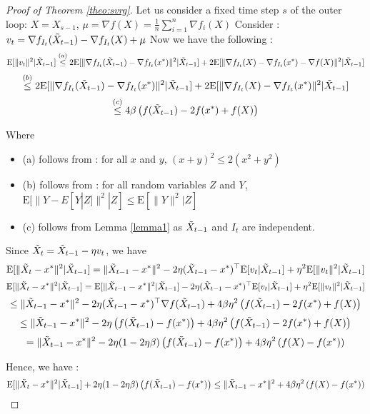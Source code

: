 \documentclass[12pt]{report}
\newcounter{theo}[section]
\newcommand{\E}{\mathrm{E}}
\begin{document}
\begin{proof}[Proof of Theorem \ref{theo:svrg}]


Let us consider a fixed time step $s$ of the outer loop: $X=X_{s-1}$, $\mu=\nabla f(X)=\frac{1}{n}\sum_{i=1}^n\nabla f_i(X)$
\newline
Consider : $v_t=\nabla f_{I_t}(\Tilde{X}_{t-1})-\nabla f_{I_t}(X)+\mu$
\newline
Now we have the following :
$$\E[\|v_t\|^2|\Tilde{X}_{t-1}]\overset{(a)}{\leq} 2 \E[\|\nabla f_{I_t}(\Tilde{X}_{t-1})-\nabla f_{I_t}(x^*)\|^2|\Tilde{X}_{t-1}]+2\E[\|\nabla f_{I_t}(X)-\nabla f_{I_t}(x^*)-\nabla f(X)\|^2|\Tilde{X}_{t-1}]$$
$$\overset{(b)}{\leq} 2 \E[\|\nabla f_{I_t}(\Tilde{X}_{t-1})-\nabla f_{I_t}(x^*)\|^2|\Tilde{X}_{t-1}]+2\E[\|\nabla f_{I_t}(X)-\nabla f_{I_t}(x^*)\|^2|\Tilde{X}_{t-1}]$$
$$\overset{(c)}{\leq} 4\beta\left( f(\Tilde{X}_{t-1})-2f(x^*)+f(X) \right)$$

Where \begin{itemize}
    \item (a) follows from : for all $x$ and $y$, $(x+y)^2\leq 2(x^2+y^2)$ 
    \item (b) follows from : for all random variables $Z$ and $Y$, $\E[\|Y-E[Y|Z]\|^2|Z]\leq \E\left[\|Y\|^2|Z\right]$
    \item (c) follows from Lemma \ref{lemma1} as $\Tilde{X}_{t-1}$ and $I_t$ are independent.
    
\end{itemize} 
Since $\Tilde{X}_{t}=\Tilde{X}_{t-1}-\eta v_t$, we have
$$\E[\|\Tilde{X}_{t}-x^*\|^2|\Tilde{X}_{t-1}]= \|\Tilde{X}_{t-1}-x^*\|^2-2\eta(\Tilde{X}_{t-1}-x^*)^\top \E[v_t|\Tilde{X}_{t-1}]+\eta^2\E[\|v_t\|^2|\Tilde{X}_{t-1}]$$
$$\E[\|\Tilde{X}_{t}-x^*\|^2|\Tilde{X}_{t-1}]=\E[\|\Tilde{X}_{t-1}-x^*\|^2|\Tilde{X}_{t-1}]-2\eta(\Tilde{X}_{t-1}-x^*)^\top\E[v_t|\Tilde{X}_{t-1}]+\eta^2\E[\|v_t\|^2|\Tilde{X}_{t-1}]$$
$$\leq \|\Tilde{X}_{t-1}-x^*\|^2-2\eta(\Tilde{X}_{t-1}-x^*)^\top\nabla f(\Tilde{X}_{t-1})+4\beta\eta^2\left(f(\Tilde{X}_{t-1})-2f(x^*)+f(X)\right) $$
$$\leq \|\Tilde{X}_{t-1}-x^*\|^2-2\eta\left( f(\Tilde{X}_{t-1})-f(x^*)\right)+4\beta \eta^2 \left( f(\Tilde{X}_{t-1})-2f(x^*)+f(X)\right) $$
$$= \|\Tilde{X}_{t-1}-x^*\|^2-2\eta(1-2\eta\beta)\left(f(\Tilde{X}_{t-1})-f(x^*)\right)+4\beta\eta^2\left(f(X)-f(x^*)\right)$$

Hence, we have :
$$\E[\|\Tilde{X}_{t}-x^*\|^2|\Tilde{X}_{t-1}]+2\eta(1-2\eta\beta)\left(f(\Tilde{X}_{t-1})-f(x^*)\right)\leq \|\Tilde{X}_{t-1}-x^*\|^2 +4\beta\eta^2\left(f(X)-f(x^*)\right)$$


\end{proof}
\end{document}
